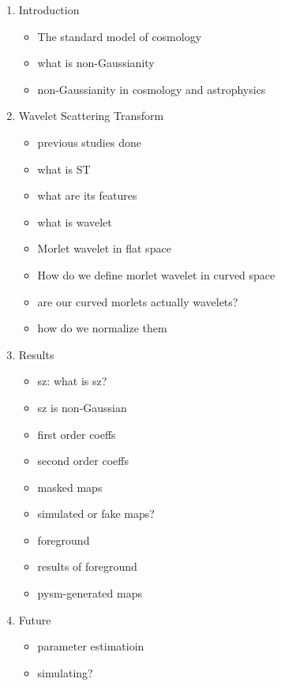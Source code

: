 \begin{enumerate}
    \item Introduction
\begin{itemize}
    \item The standard model of cosmology
    \item what is non-Gaussianity
    \item non-Gaussianity in cosmology and astrophysics
\end{itemize}
\item Wavelet Scattering Transform
\begin{itemize}
    \item previous studies done
    \item what is ST
    \item what are its features 
    \item what is wavelet 
    \item Morlet wavelet in flat space 
    \item How do we define morlet wavelet in curved space 
    \item are our curved morlets actually wavelets?
    \item how do we normalize them 
\end{itemize}
\item Results 
\begin{itemize}
    \item sz: what is sz?
    \item sz is non-Gaussian 
    \item first order coeffs 
    \item second order coeffs 
    \item masked maps
    \item simulated or fake maps?
    \item foreground 
    \item results of foreground  
    \item pysm-generated maps
\end{itemize}
\item Future
\begin{itemize}
    \item parameter estimatioin 
    \item simulating?
\end{itemize}
\end{enumerate}



